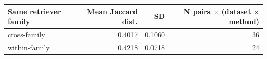 \begin{tabular}{lrrr}
\toprule
Same retriever family & Mean Jaccard dist. & SD & N pairs $\times$ (dataset $\times$ method) \\
\midrule
cross-family & 0.4017 & 0.1060 & 36 \\
within-family & 0.4218 & 0.0718 & 24 \\
\bottomrule
\end{tabular}